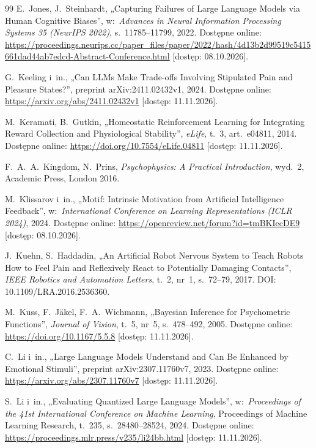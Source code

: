 \begin{thebibliography}{99}
 E.~Jones, J.~Steinhardt, „Capturing Failures of Large Language Models via Human Cognitive Biases”, w:~\textit{Advances in Neural Information Processing Systems 35 (NeurIPS 2022)}, s.~11785--11799, 2022. Dostępne online: \url{https://proceedings.neurips.cc/paper_files/paper/2022/hash/4d13b2d99519c5415661dad44ab7edcd-Abstract-Conference.html} [dostęp: 08.10.2026].

 G.~Keeling i~in., „Can {LLMs} Make Trade-offs Involving Stipulated Pain and Pleasure States?”, preprint arXiv:2411.02432v1, 2024. Dostępne online: \url{https://arxiv.org/abs/2411.02432v1} [dostęp: 11.11.2026].

 M.~Keramati, B.~Gutkin, „Homeostatic Reinforcement Learning for Integrating Reward Collection and Physiological Stability”, \textit{eLife}, t.~3, art.~e04811, 2014. Dostępne online: \url{https://doi.org/10.7554/eLife.04811} [dostęp: 11.11.2026].

 F.~A.~A.~Kingdom, N.~Prins, \textit{Psychophysics: A Practical Introduction}, wyd.~2, Academic Press, London 2016.

 M.~Klissarov i~in., „Motif: Intrinsic Motivation from Artificial Intelligence Feedback”, w:~\textit{International Conference on Learning Representations (ICLR 2024)}, 2024. Dostępne online: \url{https://openreview.net/forum?id=tmBKIecDE9} [dostęp: 08.10.2026].

 J.~Kuehn, S.~Haddadin, „An Artificial Robot Nervous System to Teach Robots How to Feel Pain and Reflexively React to Potentially Damaging Contacts”, \textit{IEEE Robotics and Automation Letters}, t.~2, nr~1, s.~72--79, 2017. DOI: 10.1109/LRA.2016.2536360.

 M.~Kuss, F.~Jäkel, F.~A.~Wichmann, „{Bayesian} Inference for Psychometric Functions”, \textit{Journal of Vision}, t.~5, nr~5, s.~478--492, 2005. Dostępne online: \url{https://doi.org/10.1167/5.5.8} [dostęp: 11.11.2026].

 C.~Li i~in., „Large Language Models Understand and Can Be Enhanced by Emotional Stimuli”, preprint arXiv:2307.11760v7, 2023. Dostępne online: \url{https://arxiv.org/abs/2307.11760v7} [dostęp: 11.11.2026].

 S.~Li i~in., „Evaluating Quantized Large Language Models”, w:~\textit{Proceedings of the 41st International Conference on Machine Learning}, Proceedings of Machine Learning Research, t.~235, s.~28480--28524, 2024. Dostępne online: \url{https://proceedings.mlr.press/v235/li24bb.html} [dostęp: 11.11.2026].


\end{thebibliography}
